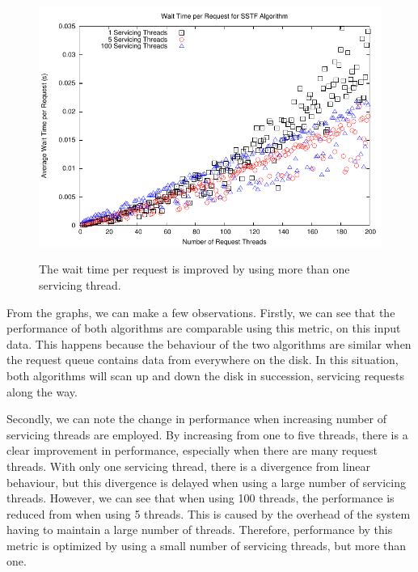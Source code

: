 \documentclass{report}
\begin{document}
\begin{figure}[htb!]
    \centering
    \includegraphics[scale=1]{waittimeSSTF.pdf}
    \label{fig:waittimeSSTF}
    \caption{The wait time per request is improved by using more than one servicing thread.}
\end{figure}
From the graphs, we can make a few observations. Firstly, we can see that the performance
of both algorithms are comparable using this metric, on this input data. This happens because
the behaviour of the two algorithms are similar when the request queue
contains data from everywhere on the disk. In this situation, both algorithms will scan up
and down the disk in succession, servicing requests along the way. 

Secondly, we can note
the change in performance when increasing number of servicing threads are employed. By
increasing from one to five threads, there is a clear improvement in  performance,
especially when there are many request threads. With only one servicing thread,
there is a divergence from linear behaviour, but this divergence is delayed when using a
large number of servicing threads. However, we can see that when using 100 threads, the
performance is reduced from when using 5 threads. This is caused by the overhead of
the system having to maintain a large number of threads. Therefore, performance by this
metric is optimized by using a small number of servicing threads, but more than one.
\end{document}
